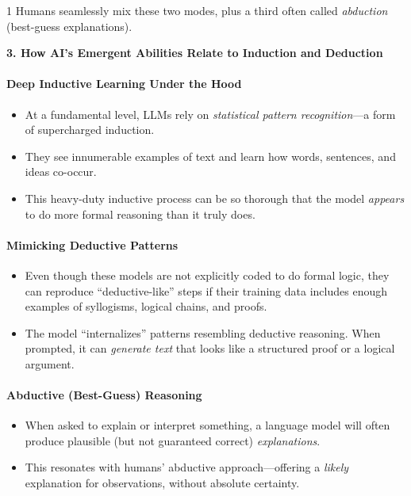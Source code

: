 {\begin{spacing}{1}
Humans seamlessly mix these two modes, plus a third often called \emph{abduction} (best-guess explanations).

\noindent \textbf{3. How AI's Emergent Abilities Relate to Induction and Deduction}

\paragraph{Deep Inductive Learning Under the Hood}
\begin{itemize}
    \item At a fundamental level, LLMs rely on \emph{statistical pattern recognition}---a form of supercharged induction.
    \item They see innumerable examples of text and learn how words, sentences, and ideas co-occur.
    \item This heavy-duty inductive process can be so thorough that the model \emph{appears} to do more formal reasoning than it truly does.
\end{itemize}

\paragraph{Mimicking Deductive Patterns}
\begin{itemize}
    \item Even though these models are not explicitly coded to do formal logic, they can reproduce ``deductive-like'' steps if their training data includes enough examples of syllogisms, logical chains, and proofs.
    \item The model ``internalizes'' patterns resembling deductive reasoning. When prompted, it can \emph{generate text} that looks like a structured proof or a logical argument.
\end{itemize}

\paragraph{Abductive (Best-Guess) Reasoning}
\begin{itemize}
    \item When asked to explain or interpret something, a language model will often produce plausible (but not guaranteed correct) \emph{explanations}.
    \item This resonates with humans' abductive approach---offering a \emph{likely} explanation for observations, without absolute certainty.
\end{itemize}


\end{spacing}}
